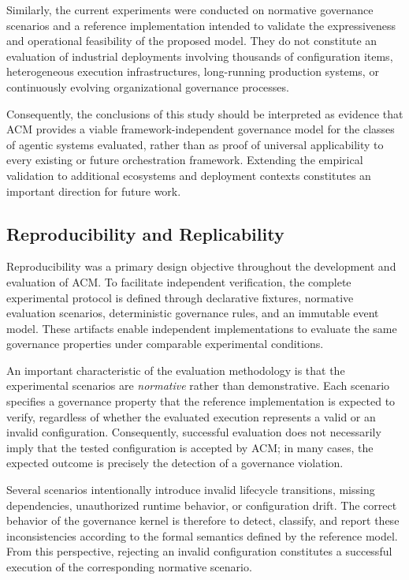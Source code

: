 \documentclass[10pt]{article}
\begin{document}
Similarly, the current experiments were conducted on normative governance scenarios and a reference implementation intended to validate the expressiveness and operational feasibility of the proposed model. They do not constitute an evaluation of industrial deployments involving thousands of configuration items, heterogeneous execution infrastructures, long-running production systems, or continuously evolving organizational governance processes.

Consequently, the conclusions of this study should be interpreted as evidence that ACM provides a viable framework-independent governance model for the classes of agentic systems evaluated, rather than as proof of universal applicability to every existing or future orchestration framework. Extending the empirical validation to additional ecosystems and deployment contexts constitutes an important direction for future work.

\subsection{Reproducibility and Replicability}
\label{subsec:reproducibility}

Reproducibility was a primary design objective throughout the development and
evaluation of ACM. To facilitate independent verification, the complete
experimental protocol is defined through declarative fixtures, normative
evaluation scenarios, deterministic governance rules, and an immutable event
model. These artifacts enable independent implementations to evaluate the same
governance properties under comparable experimental conditions.

An important characteristic of the evaluation methodology is that the
experimental scenarios are \emph{normative} rather than demonstrative. Each
scenario specifies a governance property that the reference implementation is
expected to verify, regardless of whether the evaluated execution represents a
valid or an invalid configuration. Consequently, successful evaluation does not
necessarily imply that the tested configuration is accepted by ACM; in many
cases, the expected outcome is precisely the detection of a governance
violation.

Several scenarios intentionally introduce invalid lifecycle transitions,
missing dependencies, unauthorized runtime behavior, or configuration drift.
The correct behavior of the governance kernel is therefore to detect, classify,
and report these inconsistencies according to the formal semantics defined by
the reference model. From this perspective, rejecting an invalid configuration
constitutes a successful execution of the corresponding normative scenario.
\end{document}
